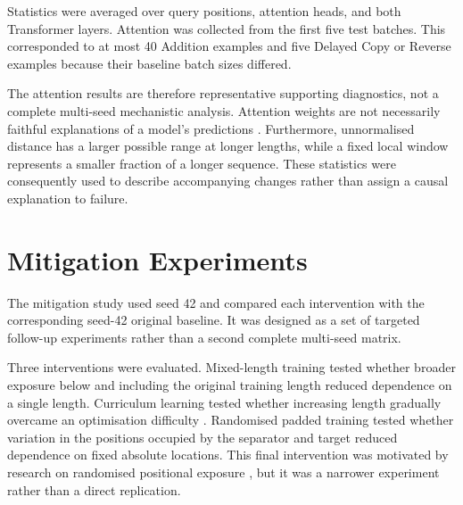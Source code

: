 \documentclass[
    author={Aanchala Ravindra Bhongade},
    supervisor={Dr. Fernando Moreno-Pino},
    degree={MSc},
    title={Length Generalisation in Transformer-Based Sequence Models: Failure Taxonomy and Mitigation Strategies},
    subtitle={},
    type={},
    year={2026}
]{dissertation}
\begin{document}
Statistics were averaged over query positions, attention heads, and both Transformer layers. Attention was collected from the first five test batches. This corresponded to at most 40 Addition examples and five Delayed Copy or Reverse examples because their baseline batch sizes differed.

The attention results are therefore representative supporting diagnostics, not a complete multi-seed mechanistic analysis. Attention weights are not necessarily faithful explanations of a model's predictions \cite{jain2019attention}. Furthermore, unnormalised distance has a larger possible range at longer lengths, while a fixed local window represents a smaller fraction of a longer sequence. These statistics were consequently used to describe accompanying changes rather than assign a causal explanation to failure.

\section{Mitigation Experiments}
\label{sec:mitigation-methodology}

The mitigation study used seed 42 and compared each intervention with the corresponding seed-42 original baseline. It was designed as a set of targeted follow-up experiments rather than a second complete multi-seed matrix.

Three interventions were evaluated. Mixed-length training tested whether broader exposure below and including the original training length reduced dependence on a single length. Curriculum learning tested whether increasing length gradually overcame an optimisation difficulty \cite{bengio2009curriculum}. Randomised padded training tested whether variation in the positions occupied by the separator and target reduced dependence on fixed absolute locations. This final intervention was motivated by research on randomised positional exposure \cite{ruoss2023randomized}, but it was a narrower experiment rather than a direct replication.
\end{document}
